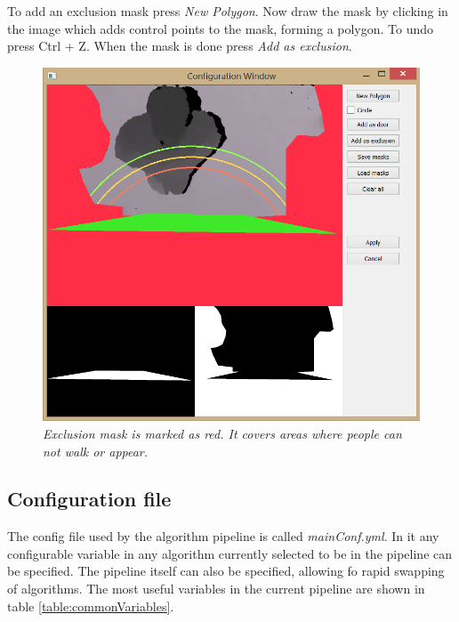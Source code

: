 To add an exclusion mask press \textit{New Polygon}. Now draw the mask by clicking in the image which adds control points to the mask, forming a polygon. To undo press Ctrl + Z. When the mask is done press \textit{Add as exclusion}.

\begin{figure}[H]
	\centering
	\includegraphics[width=\linewidth]{images/Conf4.png}
	\caption[Exclusion mask placement]{\textit{Exclusion mask is marked as red. It covers areas where people can not walk or appear.}}
	\label{fig:exMask}  %
\end{figure}

\newpage
\subsection{Configuration file}
\label{sec:ConfigurationFile}
The config file used by the algorithm pipeline is called \textit{mainConf.yml}. In it any configurable variable in any algorithm currently selected to be in the pipeline can be specified. The pipeline itself can also be specified, allowing fo rapid swapping of algorithms. The most useful variables in the current pipeline are shown in table \ref{table:commonVariables}.\\


